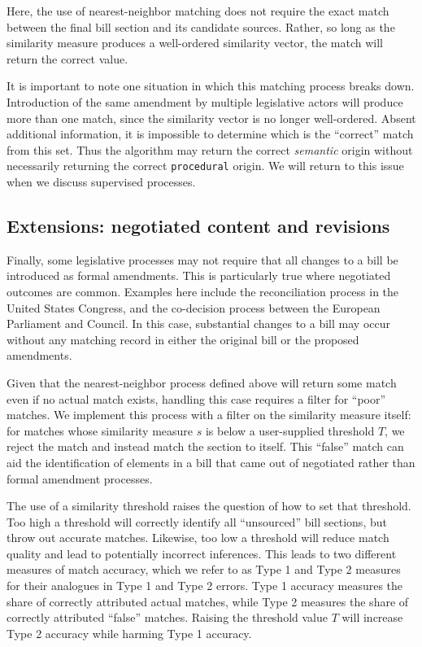 \documentclass[11pt]{article}
\begin{document}
Here, the use of nearest-neighbor matching does not require the exact
match between the final bill section and its candidate
sources. Rather, so long as the similarity measure produces a
well-ordered similarity vector, the match will return the correct value.

It is important to note one situation in which this matching process
breaks down. Introduction of the same amendment by multiple
legislative actors will produce more than one match, since the
similarity vector is no longer well-ordered. Absent additional
information, it is impossible to determine which is the ``correct''
match from this set. Thus the algorithm may return the correct
\textit{semantic} origin without necessarily returning the correct
\texttt{procedural} origin. We will return to this issue when we discuss
supervised processes.

\subsection{Extensions: negotiated content and revisions}
\label{sec:extens-negot-cont}

Finally, some legislative processes may not require that all changes
to a bill be introduced as formal amendments. This is particularly
true where negotiated outcomes are common. Examples here include the
reconciliation process in the United States Congress, and the
co-decision process between the European Parliament and Council. In
this case, substantial changes to a bill may occur without any
matching record in either the original bill or the proposed
amendments. 

Given that the nearest-neighbor process defined above will return some
match even if no actual match exists, handling this case requires a
filter for ``poor'' matches. We implement this process with a filter
on the similarity measure itself: for matches whose similarity
measure $s$ is below a user-supplied threshold $T$, we reject the
match and instead match the section to itself. This ``false'' match
can aid the identification of elements in a bill that
came out of negotiated rather than formal amendment processes. 

The use of a similarity threshold raises the question of how to set
that threshold. Too high a threshold will correctly identify all ``unsourced'' bill
sections, but throw out accurate matches. Likewise, too low a threshold
will reduce match quality and lead to potentially incorrect
inferences. This leads to two different measures of match accuracy,
which we refer to as Type 1 and Type 2 measures for their analogues in
Type 1 and Type 2 errors. Type 1 accuracy measures the share of
correctly attributed actual matches, while Type 2 measures the share
of correctly attributed ``false'' matches. Raising the threshold value
$T$ will increase Type 2 accuracy while harming Type 1
accuracy.  
\end{document}
